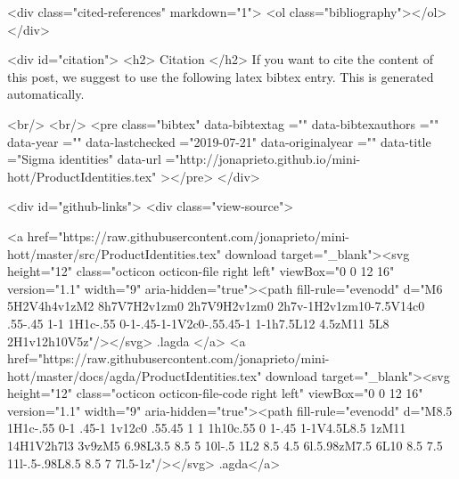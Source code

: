   <div class="cited-references" markdown="1">
  <ol class="bibliography"></ol>
  </div>


  
  <div id="citation">
  <h2> Citation </h2>
  If you want to cite the content of this post,
  we suggest to use the following latex bibtex entry.
  This is generated automatically.

  <br/>
  <br/>
  <pre class="bibtex"
       data-bibtextag =""
       data-bibtexauthors =""
       data-year =""
       data-lastchecked ="2019-07-21"
       data-originalyear =""
       data-title ="Sigma identities"
       data-url ="http://jonaprieto.github.io/mini-hott/ProductIdentities.tex"
  ></pre>
  </div>
  

  <div id="github-links">
    <div class="view-source">
      
        <a href="https://raw.githubusercontent.com/jonaprieto/mini-hott/master/src/ProductIdentities.tex" download target="_blank"><svg height="12" class="octicon octicon-file right left" viewBox="0 0 12 16" version="1.1" width="9" aria-hidden="true"><path fill-rule="evenodd" d="M6 5H2V4h4v1zM2 8h7V7H2v1zm0 2h7V9H2v1zm0 2h7v-1H2v1zm10-7.5V14c0 .55-.45 1-1 1H1c-.55 0-1-.45-1-1V2c0-.55.45-1 1-1h7.5L12 4.5zM11 5L8 2H1v12h10V5z"/></svg> .lagda </a>
        <a href="https://raw.githubusercontent.com/jonaprieto/mini-hott/master/docs/agda/ProductIdentities.tex" download target="_blank"><svg height="12" class="octicon octicon-file-code right left" viewBox="0 0 12 16" version="1.1" width="9" aria-hidden="true"><path fill-rule="evenodd" d="M8.5 1H1c-.55 0-1 .45-1 1v12c0 .55.45 1 1 1h10c.55 0 1-.45 1-1V4.5L8.5 1zM11 14H1V2h7l3 3v9zM5 6.98L3.5 8.5 5 10l-.5 1L2 8.5 4.5 6l.5.98zM7.5 6L10 8.5 7.5 11l-.5-.98L8.5 8.5 7 7l.5-1z"/></svg> .agda</a>
      
